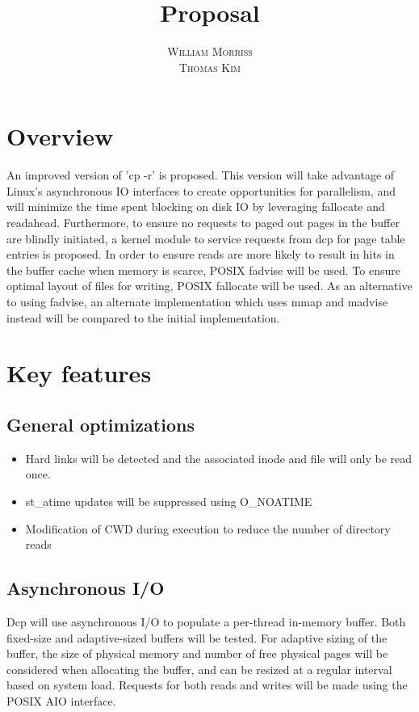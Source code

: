 \documentclass[12pt]{article}
\title{\vspace{-25mm}\fontsize{16pt}{10pt}\selectfont\textbf{Proposal}} %
\author{
  \textsc{William Morriss} \\
  \textsc{Thomas Kim}
}
\date{}
\begin{document}
\maketitle %

\section{Overview}
An improved version of 'cp -r' is proposed.
This version will take advantage of Linux's asynchronous IO interfaces to create
opportunities for parallelism, and will minimize the time spent blocking on disk
IO by leveraging fallocate and readahead. Furthermore, to ensure no requests to
paged out pages in the buffer are blindly initiated, a kernel module to service
requests from dcp for page table entries is proposed. In order to ensure reads
are more likely to result in hits in the buffer cache when memory is scarce, POSIX
fadvise will be used. To ensure optimal layout of files for writing, POSIX
fallocate will be used. As an alternative to using fadvise, an alternate
implementation which uses mmap and madvise instead will be compared to the initial implementation.

\section{Key features}
\subsection{General optimizations}
\begin{itemize}
    \item Hard links will be detected and the associated inode and file will
          only be read once.
    \item st\_atime updates will be suppressed using O\_NOATIME
    \item Modification of CWD during execution to reduce the number
          of directory reads
\end{itemize}
\subsection{Asynchronous I/O}
Dcp will use asynchronous I/O to populate a per-thread in-memory buffer.
Both fixed-size and adaptive-sized buffers will be tested.
For adaptive sizing of the buffer, the size of physical memory
and number of free physical pages will be considered when allocating
the buffer, and can be resized at a regular interval based on system load.
Requests for both reads and writes will be made using the POSIX AIO interface.
\end{document}
